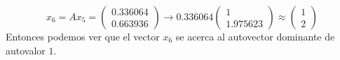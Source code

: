 \begin{frame}
\begin{solution}
\begin{enumerate}[d)]
			      \begin{equation*}
				      x_{6}=
				      Ax_{5}=
				      \begin{pmatrix}
					      0.336064 \\
					      0.663936
				      \end{pmatrix}\to
				      0.336064
				      \begin{pmatrix}
					      1 \\
					      1.975623
				      \end{pmatrix}\approx
				      \begin{pmatrix}
					      1 \\
					      2
				      \end{pmatrix}
			      \end{equation*}
			      Entonces podemos ver que el vector $x_{6}$ se acerca
			      al autovector dominante de autovalor $1$.
		\end{enumerate}
	\end{solution}

\end{frame}
